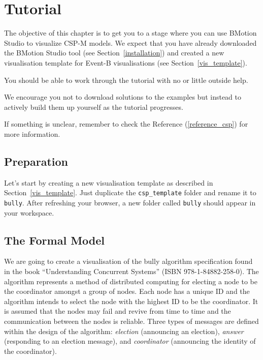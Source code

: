 \section{Tutorial}
\label{tutorial_csp}

The objective of this chapter is to get you to a stage where you can use BMotion Studio to visualize CSP-M models. 
We expect that you have already downloaded the BMotion Studio tool (see Section~\ref{installation}) and created a new visualisation template for Event-B visualisations (see Section~\ref{vis_template}).
 
You should be able to work through the tutorial with no or little outside help.

We encourage you not to download solutions to the examples but instead to actively build them up yourself as the tutorial progresses.

If something is unclear, remember to check the Reference (\ref{reference_csp}) for more information.

\subsection{Preparation}

Let's start by creating a new visualisation template as described in Section~\ref{vis_template}.
Just duplicate the \texttt{csp\_template} folder and rename it to \texttt{bully}.
After refreshing your browser, a new folder called \texttt{bully} should appear in your workspace.

\subsection{The Formal Model}

We are going to create a visualisation of the bully algorithm specification found in the book ``Understanding Concurrent Systems'' (ISBN 978-1-84882-258-0).
The algorithm represents a method of distributed computing for electing a node to be the coordinator amongst a group of nodes.
Each node has a unique ID and the algorithm intends to select the node with the highest ID to be the coordinator.
It is assumed that the nodes may fail and revive from time to time and the communication between the nodes is reliable.
Three types of messages are defined within the design of the algorithm: \textit{election} (announcing an election), \textit{answer} (responding to an election message), and \textit{coordinator} (announcing the identity of the coordinator).

